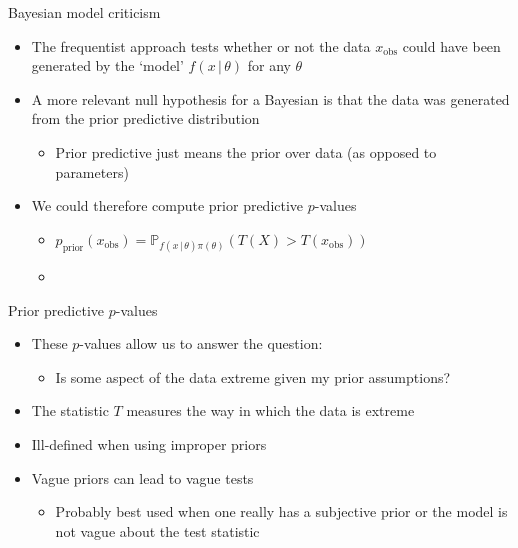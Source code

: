 \begin{frame}{Bayesian model criticism}
  \begin{itemize}
    \item The frequentist approach tests whether or not the data $x_{\textrm{obs}}$ could have been generated by the `model' $f(x\,|\,\theta)$ for any $\theta$
    \vspace{\baselineskip}
    \pause
    \item A more relevant null hypothesis for a Bayesian is that the data was generated from the prior predictive distribution
    \begin{itemize}
      \item Prior predictive just means the prior over data (as opposed to parameters)
    \end{itemize}
    \vspace{\baselineskip}
    \pause
    \item We could therefore compute prior predictive $p$-values
    \begin{itemize}
      \item $p_{\textrm{prior}}(x_{\textrm{obs}}) = \mathbb{P}_{f(x\,|\,\theta)\pi(\theta)}(T(X) > T(x_{\textrm{obs}}))$
      \item \cite{Box1980-ud}
    \end{itemize}
  \end{itemize}
\end{frame}

\begin{frame}{Prior predictive $p$-values}
  \begin{itemize}
    \item These $p$-values allow us to answer the question:
    \begin{itemize}
      \item Is some aspect of the data extreme given my prior assumptions?
    \end{itemize}
    \vspace{\baselineskip}
    \pause
    \item The statistic $T$ measures the way in which the data is extreme
    \vspace{\baselineskip}
    \pause
    \item Ill-defined when using improper priors 
    \vspace{\baselineskip}
    \pause
    \item Vague priors can lead to vague tests
    \begin{itemize}
      \item Probably best used when one really has a subjective prior or the model is not vague about the test statistic
    \end{itemize}
  \end{itemize}
\end{frame}

